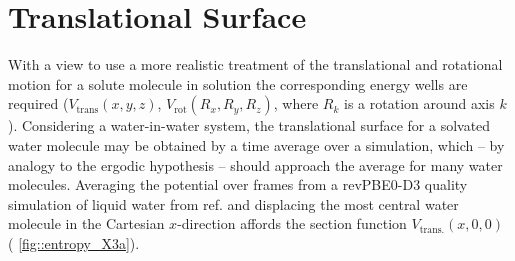 \documentclass[../main.tex]{subfiles}
\begin{document}
\section{Translational Surface}
With a view to use a more realistic treatment of the translational and rotational motion for a solute molecule in solution the corresponding energy wells are required ($V_\text{trans}(x, y, z)$, $V_\text{rot}(R_x, R_y, R_z)$, where $R_k$ is a rotation around axis $k$). Considering a water-in-water system, the translational surface for a solvated water molecule may be obtained by a time average over a simulation, which -- by analogy to the ergodic hypothesis -- should approach the average for many water molecules. Averaging the potential over frames from a revPBE0-D3 quality simulation of liquid water from ref. \cite{Young2021GAP} and displacing the most central water molecule in the Cartesian $x$-direction affords the section function $V_\text{trans.}(x, 0, 0)$ (\figurename{ \ref{fig::entropy_X3a}}). 
\end{document}
